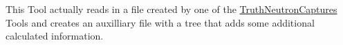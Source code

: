 This Tool actually reads in a file created by one of the \mbox{\hyperlink{classTruthNeutronCaptures}{Truth\+Neutron\+Captures}} Tools and creates an auxilliary file with a tree that adds some additional calculated information. 